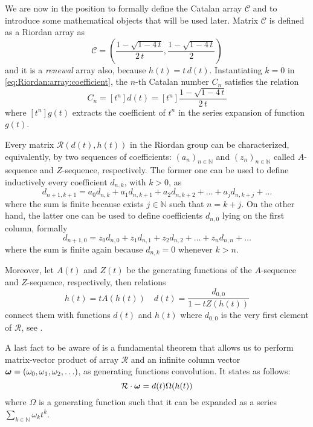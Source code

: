 We are now in the position to formally define the Catalan
array $\mathcal{C}$ and to introduce some mathematical objects
that will be used later. Matrix $\mathcal{C}$ is defined 
as a Riordan array as
\begin{displaymath}
    \mathcal{C}=\left(\frac{1-\sqrt{1-4\,t}}{2\,t},
        \frac{1-\sqrt{1-4\,t}}{2}\right)
\end{displaymath}
and it is a \emph{renewal} array \cite{rogers:1977} also, because $h(t)=t\,d(t)$.
Instantiating $k=0$ in \autoref{eq:Riordan:array:coefficient},
the $n$-th Catalan number $C_{n}$ satisfies the relation
\begin{displaymath}
    C_{n} = [t^{n}]d(t)= [t^{n}]\frac{1-\sqrt{1-4\,t}}{2\,t}
\end{displaymath}
where $[t^{n}]g(t)$ extracts the coefficient of $t^{n}$ in the series expansion of function $g(t)$.

Every matrix $\mathcal{R}(d(t), h(t))$ in the Riordan group can be characterized, equivalently,
by two sequences of coefficients: $\left(a_{n}\right)_{n\in\mathbb{N}}$  and
$\left(z_{n}\right)_{n\in\mathbb{N}}$ called $A$-sequence and $Z$-sequence, 
respectively. The former one can be used to define inductively every coefficient $d_{n,k}$, with $k>0$, as 
\begin{equation}
    d_{n+1, k+1} = a_{0}d_{n,k} + a_{1}d_{n,k+1} + a_{2}d_{n,k+2} + \ldots + a_{j}d_{n,k+j} + \ldots %
\end{equation}
where the sum is finite because exists $j\in\mathbb{N}$ such that $n=k+j$. On the other hand, the latter one
can be used to define coefficients $d_{n,0}$ lying on the first column, formally
\begin{equation}
    d_{n+1, 0} = z_{0}d_{n,0} + z_{1}d_{n,1} + z_{2}d_{n,2} + \ldots + z_{n}d_{n,n} + \ldots %
\end{equation}
where the sum is finite again because $d_{n,k}=0$ whenever $k>n$.

Moreover, let $A(t)$ and $Z(t)$ be the generating functions of the $A$-sequence and $Z$-sequence, respectively,
then relations 
\begin{equation}
    h(t) = tA(h(t)) \quad d(t)=\frac{d_{0,0}}{1-tZ(h(t))}
\end{equation}
connect them with functions $d(t)$ and $h(t)$ 
where $d_{0,0}$ is the very first element %
of $\mathcal{R}$, see \cite{merlini:some:alternative:characterizations:1997}.

A last fact to be aware of is a fundamental theorem that allows us to perform 
matrix-vector product of array $\mathcal{R}$ and an infinite column vector 
$\boldsymbol{\omega}=(\omega_{0},\omega_{1},\omega_{2},\ldots)$,
as generating functions convolution. It states as follows:
\begin{equation}
    \mathcal{R}\cdot\boldsymbol{\omega} = d(t)\Omega(h(t))    
\end{equation}
where $\Omega$ is a generating function such that it can be expanded 
as a series $\sum_{k\in\mathbb{N}}{\omega_{k}t^{k}}$.

